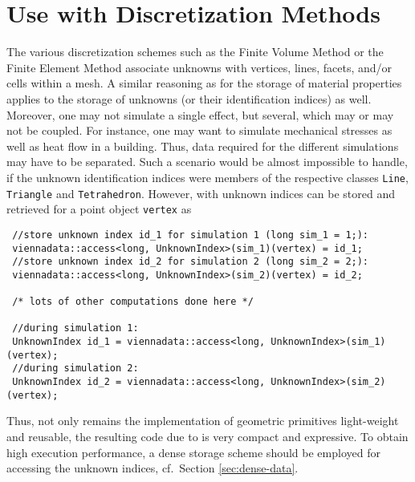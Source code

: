 \section{Use with Discretization Methods}
The various discretization schemes such as the Finite Volume Method or the Finite Element Method associate unknowns with vertices, lines, facets, and/or cells within a mesh.
A similar reasoning as for the storage of material properties applies to the storage of unknowns (or their identification indices) as well. Moreover, one may not simulate a single effect, but several, which may or may not be coupled. For instance, one may want to simulate mechanical stresses as well as heat flow in a building. Thus, data required for the different simulations may have to be separated. Such a scenario would be almost impossible to handle, if the unknown identification indices were members of the respective classes \lstinline|Line|, \lstinline|Triangle| and \lstinline|Tetrahedron|. However, with {\ViennaData} unknown indices can be stored and retrieved for a point object \lstinline|vertex| as
\begin{lstlisting}
 //store unknown index id_1 for simulation 1 (long sim_1 = 1;):
 viennadata::access<long, UnknownIndex>(sim_1)(vertex) = id_1;
 //store unknown index id_2 for simulation 2 (long sim_2 = 2;):
 viennadata::access<long, UnknownIndex>(sim_2)(vertex) = id_2;

 /* lots of other computations done here */

 //during simulation 1:
 UnknownIndex id_1 = viennadata::access<long, UnknownIndex>(sim_1)(vertex);
 //during simulation 2:
 UnknownIndex id_2 = viennadata::access<long, UnknownIndex>(sim_2)(vertex);
\end{lstlisting}
Thus, not only remains the implementation of geometric primitives light-weight and reusable, the resulting code due to {\ViennaData} is very compact and expressive.
To obtain high execution performance, a dense storage scheme should be employed for accessing the unknown indices, cf.~Section \ref{sec:dense-data}.


